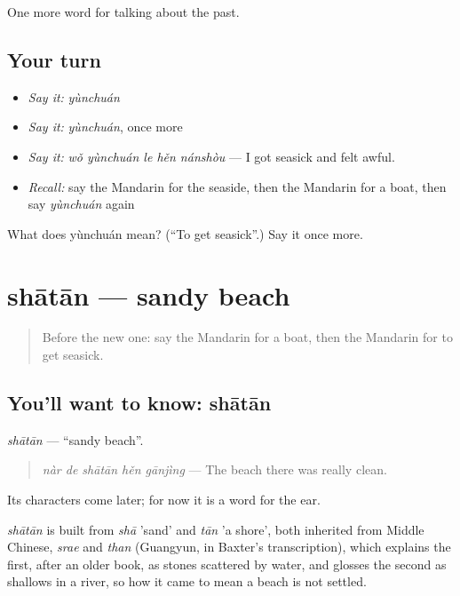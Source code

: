 \begin{grammarlens}[title={What you've built}]
One more word for talking about the past.
\end{grammarlens}

\subsection*{Your turn}
\begin{itemize}
\raggedright
  \item \emph{Say it:} \emph{yùnchuán}
  \item \emph{Say it:} \emph{yùnchuán}, once more
  \item \emph{Say it:} \emph{wǒ yùnchuán le hěn nánshòu} — I got seasick and felt awful.
  \item \emph{Recall:} say the Mandarin for the seaside, then the Mandarin for a boat, then say \emph{yùnchuán} again
\end{itemize}

\begin{tcolorbox}[breakable,colback=teal!4,colframe=teal!35!black,title={Before you move on}]
What does yùnchuán mean? (\textquotedblleft{}To get seasick\textquotedblright{}.) Say it once more.
\end{tcolorbox}
\section[shātān]{shātān — sandy beach}

\label{lesson:ZH-C227-shatan}



\begin{quote}
Before the new one: say the Mandarin for a boat, then the Mandarin for to get seasick.
\end{quote}

\subsection*{You'll want to know: shātān}
\emph{shātān} — \textquotedblleft{}sandy beach\textquotedblright{}.

\begin{quote}
\emph{nàr de shātān hěn gānjìng} — The beach there was really clean.
\end{quote}

Its characters come later; for now it is a word for the ear.

\begin{cousinweb}
\emph{shātān} is built from \emph{shā} 'sand' and \emph{tān} 'a shore', both inherited from Middle Chinese, \emph{srae} and \emph{than} (Guangyun, in Baxter's transcription), which explains the first, after an older book, as stones scattered by water, and glosses the second as shallows in a river, so how it came to mean a beach is not settled.
\end{cousinweb}

